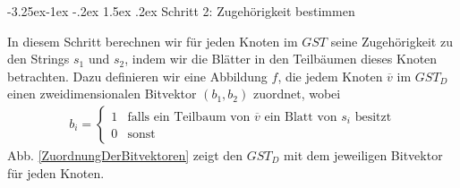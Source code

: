 \documentclass[12pt]{report}
\makeatletter
\renewcommand\paragraph{\@startsection{paragraph}{4}{\z@}%
    {-3.25ex\@plus -1ex \@minus -.2ex}%
    {1.5ex \@plus .2ex}%
    {\normalfont\normalsize\bfseries}}
\makeatother
\begin{document}
\paragraph{Schritt 2: Zugehörigkeit bestimmen}

In diesem Schritt berechnen wir für jeden Knoten im $GST$ seine Zugehörigkeit zu den Strings $s_1$ und $s_2$, indem wir die Blätter in den Teilbäumen dieses Knoten betrachten. Dazu definieren wir eine Abbildung $f$, die jedem Knoten $\overline{v}$ im $GST_D$ einen zweidimensionalen Bitvektor $(b_1, b_2)$ zuordnet, wobei
\begin{gather*}
    b_i = \begin{cases}
        1 &\text{falls ein Teilbaum von } \overline{v} \text{ ein Blatt von } s_i \text{ besitzt} \\
        0 &\text{sonst}
    \end{cases}
\end{gather*}
Abb. \ref{ZuordnungDerBitvektoren} zeigt den $GST_D$ mit dem jeweiligen Bitvektor für jeden Knoten.
\end{document}
